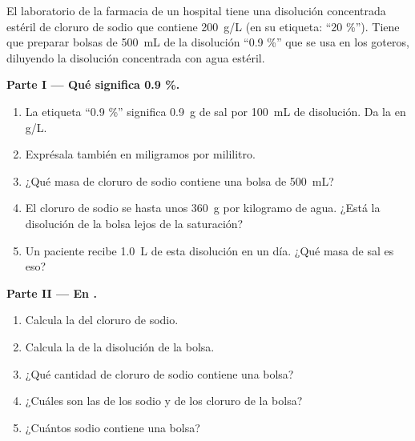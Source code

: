 \begin{problem}
\label{pb:g10:concentration-and-dilution:1}
El laboratorio de la farmacia de un hospital tiene una disolución
concentrada estéril de cloruro de sodio que contiene \qty{200}{g/L} (en
su etiqueta: ``20 \%''). Tiene que preparar bolsas de \qty{500}{mL} de
la disolución ``0.9 \%'' que se usa en los goteros, diluyendo la
disolución concentrada con agua estéril.

\medskip
\noindent\textbf{Parte I --- Qué significa 0.9 \%.}
\begin{enumerate}
  \item La etiqueta ``0.9 \%'' significa \qty{0.9}{g} de sal por
        \qty{100}{mL} de disolución. Da la  en
        \si{g/L}.
  \item Exprésala también en miligramos por mililitro.
  \item ¿Qué masa de cloruro de sodio contiene una bolsa de
        \qty{500}{mL}?
  \item El cloruro de sodio se  hasta unos \qty{360}{g} por
        kilogramo de agua. ¿Está la disolución de la bolsa lejos de la
        saturación?
  \item Un paciente recibe \qty{1.0}{L} de esta disolución en un día.
        ¿Qué masa de sal es eso?
\end{enumerate}

\medskip
\noindent\textbf{Parte II --- En .}
\begin{enumerate}[resume]
  \item Calcula la  del cloruro de sodio.
  \item Calcula la  de la disolución de la bolsa.
  \item ¿Qué cantidad de cloruro de sodio contiene una bolsa?
  \item ¿Cuáles son las  de los  sodio y de
        los  cloruro de la bolsa?
  \item ¿Cuántos  sodio contiene una bolsa?
\end{enumerate}


\end{problem}
